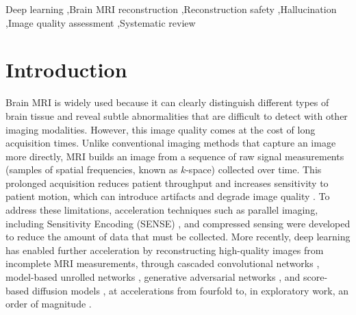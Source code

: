 \documentclass[review,authoryear]{elsarticle}
\begin{document}
\begin{frontmatter}
\begin{keyword}
Deep learning \sep Brain MRI reconstruction \sep Reconstruction safety \sep Hallucination \sep Image quality assessment \sep Systematic review
\end{keyword}

\end{frontmatter}







\section{Introduction}

Brain MRI is widely used because it can clearly distinguish different types of brain
tissue and reveal subtle abnormalities that are difficult to detect with other imaging
modalities. However, this image quality comes at the cost of long acquisition times.
Unlike conventional imaging methods that capture an image more directly, MRI builds an
image from a sequence of raw signal measurements (samples of spatial frequencies, known
as $k$-space) collected over time. This prolonged acquisition reduces patient
throughput and increases sensitivity to patient motion, which can introduce artifacts
and degrade image quality \citep{zaitsev2015motion}. To address these limitations,
acceleration techniques such as parallel imaging, including Sensitivity Encoding (SENSE)
\citep{pruessmann1999sense}, and compressed sensing \citep{lustig2007compressed} were
developed to reduce the amount of data that must be collected. More recently, deep
learning has enabled further acceleration by reconstructing high-quality images from
incomplete MRI measurements, through cascaded convolutional networks
\citep{schlemper2017deep}, model-based unrolled networks
\citep{hammernik2018learning,aggarwal2018modl}, generative adversarial networks
\citep{yang2018dagan}, and score-based diffusion models \citep{song2021score}, at
accelerations from fourfold to, in exploratory work, an order of magnitude
\citep{radmanesh2022exploring}.
\end{document}
